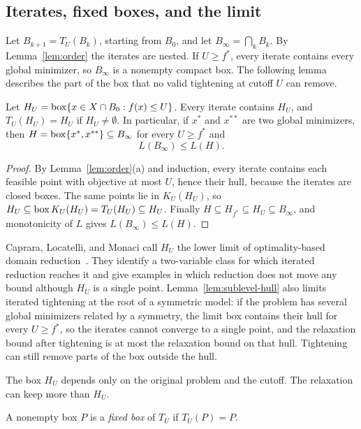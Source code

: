 \subsection{Iterates, fixed boxes, and the limit}

Let $B_{k+1}=T_U(B_k)$, starting from $B_0$, and let
$B_\infty=\bigcap_kB_k$. By Lemma~\ref{lem:order} the iterates are nested.
If $U\ge f^*$, every iterate contains every global minimizer, so $B_\infty$
is a nonempty compact box. The following lemma describes the part of the
box that no valid tightening at cutoff $U$ can remove.

\begin{lemma}\label{lem:sublevel-hull}
Let $H_U=\operatorname{box}\{x\in X\cap B_0:f(x)\le U\}$. Every iterate contains $H_U$,
and $T_U(H_U)=H_U$ if $H_U\ne\emptyset$. In particular, if $x^*$ and
$x^{**}$ are two global minimizers, then
$H=\operatorname{box}\{x^*,x^{**}\}\subseteq B_\infty$ for every $U\ge f^*$ and
\[
  L(B_\infty)\le L(H).
\]
\end{lemma}

\begin{proof}
By Lemma~\ref{lem:order}(a) and induction, every iterate contains each
feasible point with objective at most $U$, hence their hull, because the
iterates are closed boxes. The same points lie in $K_U(H_U)$, so
$H_U\subseteq\operatorname{box} K_U(H_U)=T_U(H_U)\subseteq H_U$. Finally
$H\subseteq H_{f^*}\subseteq H_U\subseteq B_\infty$, and monotonicity of $L$
gives $L(B_\infty)\le L(H)$.
\end{proof}

Caprara, Locatelli, and Monaci call $H_U$ the lower limit of
optimality-based domain
reduction~\cite{caprara2016-theoretical-and-computational-results-about}.
They identify a two-variable class for which iterated reduction reaches it
and give examples in which reduction does not move any bound although
$H_U$ is a single point. Lemma~\ref{lem:sublevel-hull} also limits iterated
tightening at the root of a symmetric model: if the problem has several
global minimizers related by a symmetry, the limit box contains their hull
for every $U\ge f^*$, so the iterates cannot converge to a single point, and
the relaxation bound after tightening is at most the relaxation bound on
that hull. Tightening can still remove parts of the box outside the hull.

The box $H_U$ depends only on the original problem and the cutoff. The
relaxation can keep more than $H_U$.

\begin{definition}
A nonempty box $P$ is a \emph{fixed box} of $T_U$ if $T_U(P)=P$.
\end{definition}

